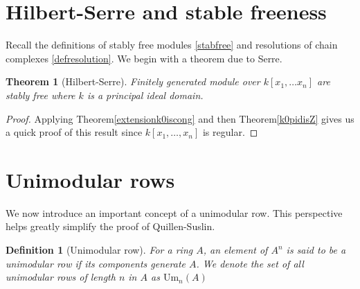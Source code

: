 \documentclass[12pt]{report}
\numberwithin{equation}{section}
\newcounter{dummy} \numberwithin{dummy}{section}
\newtheorem{theorem}[dummy]{Theorem}
\newtheorem{definition}[dummy]{Definition}
\begin{document}
	\section{Hilbert-Serre and stable freeness}
%
%		
%		
%	
	Recall the definitions of stably free modules \ref{stabfree} and resolutions of chain complexes \ref{defresolution}. We begin with a theorem due to Serre.
	\begin{theorem}[Hilbert-Serre]
	Finitely generated module over $k[x_1,\dots x_n]$ are stably free where $k$ is a principal ideal domain.
	\end{theorem}
	\begin{proof}
		Applying Theorem\ref{extensionk0iscong} and then Theorem\ref{k0pidisZ} gives us a quick proof of this result since $k[x_1,\dots,x_n]$ is regular. 
		
%		
	\end{proof}
	
	\section{Unimodular rows}
	We now introduce an important concept of a unimodular row. This perspective helps greatly simplify the proof of Quillen-Suslin.
	
	\begin{definition}[Unimodular row]
		For a ring $A$, an element of $A^n$ is said to be a unimodular row if its components generate $A$. We denote the set of all unimodular rows of length $n$ in $A$ as $\mathrm{Um}_n(A)$
	\end{definition}
	
\end{document}
